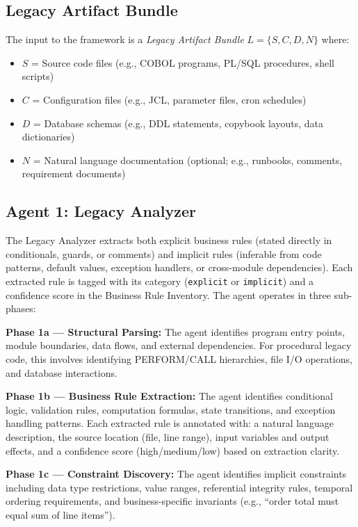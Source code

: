 \documentclass[conference]{IEEEtran}
\begin{document}
\subsection{Legacy Artifact Bundle}

The input to the framework is a \textit{Legacy Artifact Bundle} $L = \{S, C, D, N\}$ where:

\begin{itemize}
    \item $S$ = Source code files (e.g., COBOL programs, PL/SQL procedures, shell scripts)
    \item $C$ = Configuration files (e.g., JCL, parameter files, cron schedules)
    \item $D$ = Database schemas (e.g., DDL statements, copybook layouts, data dictionaries)
    \item $N$ = Natural language documentation (optional; e.g., runbooks, comments, requirement documents)
\end{itemize}

\subsection{Agent 1: Legacy Analyzer}

The Legacy Analyzer extracts both explicit business rules (stated directly in conditionals, guards, or comments) and implicit rules (inferable from code patterns, default values, exception handlers, or cross-module dependencies). Each extracted rule is tagged with its category (\texttt{explicit} or \texttt{implicit}) and a confidence score in the Business Rule Inventory. The agent operates in three sub-phases:

\textbf{Phase 1a --- Structural Parsing:} The agent identifies program entry points, module boundaries, data flows, and external dependencies. For procedural legacy code, this involves identifying PERFORM/CALL hierarchies, file I/O operations, and database interactions.

\textbf{Phase 1b --- Business Rule Extraction:} The agent identifies conditional logic, validation rules, computation formulas, state transitions, and exception handling patterns. Each extracted rule is annotated with: a natural language description, the source location (file, line range), input variables and output effects, and a confidence score (high/medium/low) based on extraction clarity.

\textbf{Phase 1c --- Constraint Discovery:} The agent identifies implicit constraints including data type restrictions, value ranges, referential integrity rules, temporal ordering requirements, and business-specific invariants (e.g., ``order total must equal sum of line items'').
\end{document}
